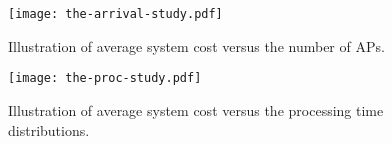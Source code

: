 \begin{figure}[ht!]
    \centering
    \begin{minipage}[b]{0.23\textwidth}
        \texttt{[image: the-arrival-study.pdf]}
        \caption{Illustration of average system cost versus the number of APs.}
        \label{fig:ss_scale}
    \end{minipage}
    \begin{minipage}[b]{0.23\textwidth}
        \texttt{[image: the-proc-study.pdf]}
        \caption{Illustration of average system cost versus the processing time distributions.}
        \label{fig:ss_dist}
    \end{minipage}
\end{figure}




